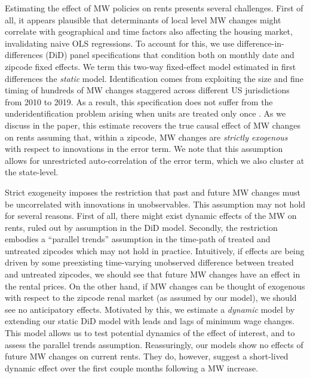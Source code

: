 Estimating the effect of MW policies on rents presents several challenges. First of all, it 
appears plausible that determinants of local level MW changes might correlate with 
geographical and time factors also affecting the housing market, invalidating naive OLS 
regressions. To account for this, we use difference-in-differences (DiD) panel specifications 
that condition both on monthly date and zipcode fixed effects. We term this two-way 
fixed-effect model estimated in first differences the \textit{static} model. Identification 
comes from exploiting the size and fine timing of hundreds of MW changes staggered across 
different US jurisdictions from 2010 to 2019. As a result, this specification does not 
suffer from the underidentification problem arising when units are treated only once 
\parencite{BorusyakJaravel2017}. As we discuss in the paper, this estimate recovers the true 
causal effect of MW changes on rents assuming that, within a zipcode, MW changes are 
\textit{strictly exogenous} with respect to innovations in the error term. We note that 
this assumption allows for unrestricted auto-correlation of the error term, which we also 
cluster at the state-level.

Strict exogeneity imposes the restriction that past and future MW changes must be uncorrelated 
with innovations in unobservables. This assumption may not hold for several reasons. First of 
all, there might exist dynamic effects of the MW on rents, ruled out by assumption in the DiD 
model. Secondly, the restriction embodies a ``parallel trends'' assumption in the time-path of 
treated and untreated zipcodes which may not hold in practice. Intuitively, if effects are 
being driven by some preexisting time-varying unobserved difference between treated and untreated 
zipcodes, we should see that future MW changes have an effect in the rental prices. On the other 
hand, if MW changes can be thought of exogenous with respect to the zipcode renal market (as 
assumed by our model), we should see no anticipatory effects. Motivated by this, we estimate a 
\textit{dynamic} model by extending our static DiD model with leads and lags of minimum wage 
changes. This model allows us to test potential dynamics of the effect of interest, and to 
assess the parallel trends assumption. Reassuringly, our models show no effects of future MW 
changes on current rents. They do, however, suggest a short-lived dynamic effect over the first 
couple months following a MW increase.

